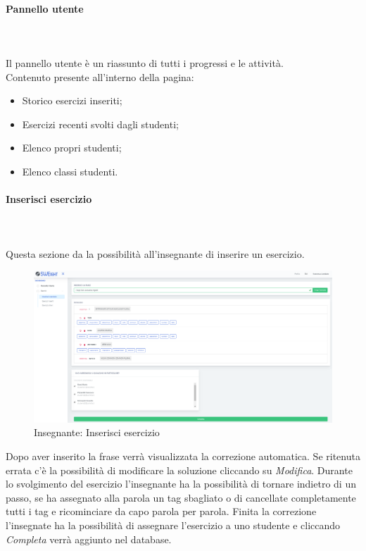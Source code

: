         
        
        \paragraph{Pannello utente}\mbox{}\\ \\
          Il pannello utente è un riassunto di tutti i progressi e le attività.
         \\Contenuto presente all'interno della pagina:
        	\begin{itemize}
        	\item Storico esercizi inseriti; 
        	\item Esercizi recenti svolti dagli studenti;
        	\item Elenco propri studenti;
        	\item Elenco classi studenti.
        	\end{itemize}
        
        
        
        
        \paragraph{Inserisci esercizio}\mbox{}\\ \\
          Questa sezione da la possibilità all'insegnante di inserire un esercizio.
        	\begin{figure}[H]
            \centering
        	\includegraphics[width=17cm]{sez/img/insegnante/inserisciEsercizio.PNG} 
            \caption{Insegnante: Inserisci esercizio}\label{fig:1}
        	\end{figure}
        
          Dopo aver inserito la frase verrà visualizzata la correzione automatica. Se ritenuta errata c'è la possibilità di modificare la soluzione cliccando su \textit{Modifica}. Durante lo svolgimento del esercizio l'insegnante ha la possibilità di tornare indietro di un passo, se ha assegnato alla parola un tag sbagliato o di cancellate completamente tutti i tag e ricominciare da capo parola per parola. Finita la correzione l'insegnate ha la possibilità di assegnare l'esercizio a uno studente e cliccando \textit{Completa} verrà aggiunto nel database.
        
